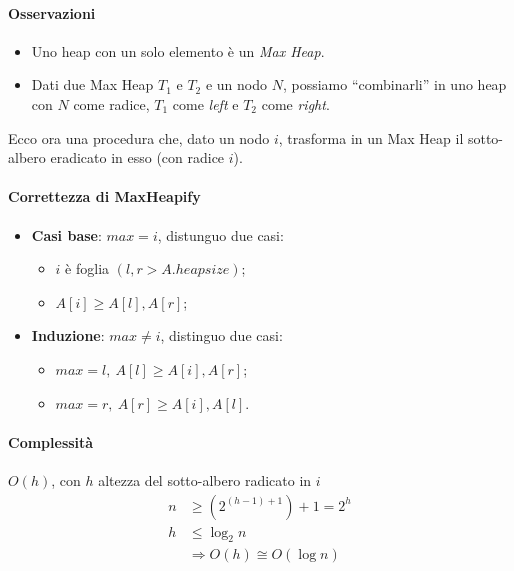 \paragraph{Osservazioni}
\begin{itemize}[label=$\bullet$]
	\item Uno heap con un solo elemento è un \emph{Max Heap}.
	\item Dati due Max Heap $T_1$ e $T_2$ e un nodo $N$, possiamo ``combinarli'' in uno heap con
	$N$ come radice, $T_1$ come \emph{left} e $T_2$ come \emph{right}.
\end{itemize}

Ecco ora una procedura che, dato un nodo $i$, trasforma in un Max Heap il sotto-albero eradicato in esso (con radice $i$).



\paragraph{Correttezza di MaxHeapify} 
\begin{itemize}
	\item \textbf{Casi base}: $max = i$, distunguo due casi:
	\begin{itemize}
		\item $i$ è foglia $(l, r > A.heapsize)$;
		\item $A[i] \geq A[l], A[r]$;
	\end{itemize}
	\item \textbf{Induzione}: $max \neq i$, distinguo due casi:
	\begin{itemize}
		\item $max = l, \ A[l] \geq A[i], A[r]$;
		\item $max = r, \ A[r] \geq A[i], A[l]$.
	\end{itemize}
\end{itemize}
\paragraph{Complessità} $O(h)$, con $h$ altezza del sotto-albero radicato in $i$
\begin{align*}
	n & \geq (2^{(h - 1) + 1}) + 1 = 2^h \\
	h & \leq \log_2 n \\
	& \Rightarrow O(h) \cong O(\log n)
\end{align*}

